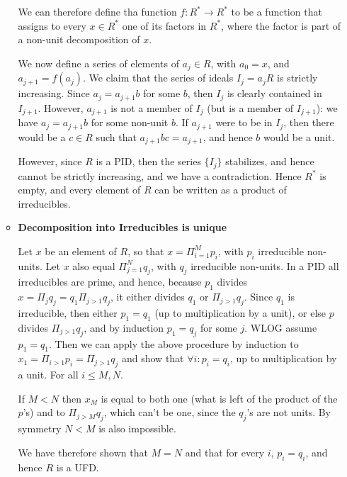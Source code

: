 \documentclass[11pt]{article} \usepackage{amssymb}
\begin{document}
\begin{enumerate}
\begin{itemize}
      We can therefore define tha function $f:R^*\to R^*$ to be a function
      that assigns to every $x\in R^*$ one of its factors in $R^*$, 
      where the factor is part of a non-unit decomposition of $x$.

      We now define a series of elements of $a_j\in R$, with $a_0=x$, 
      and $a_{j+1}=f(a_j)$. We claim that the series of ideals $I_j=a_jR$ is strictly
      increasing. Since $a_j=a_{j+1}b$ for some $b$, then $I_j$ is clearly
      contained in $I_{j+1}$. However, $a_{j+1}$ is not a member of $I_j$ (but
      is a member of $I_{j+1}$): we have $a_j=a_{j+1}b$ for some non-unit $b$. If 
      $a_{j+1}$ were to be in $I_j$, then 
      there would be a $c\in R$ such that $a_{j+1}bc=a_{j+1}$, and hence $b$ would be
      a unit.

      However, since $R$ is a PID, then the series $\{I_j\}$ stabilizes, and 
      hence cannot be strictly increasing, and we have a contradiction. Hence
      $R^*$ is empty, and every element of $R$ can be written as a product
      of irreducibles.
      
    \item {\bf Decomposition into Irreducibles is unique}

      Let $x$ be an element of $R$, so that 
      $x=\Pi_{i=1}^Mp_i$, with $p_i$ irreducible non-units.
      Let $x$ also equal $\Pi_{j=1}^Nq_j$, with $q_j$ irreducible non-units.
      In a PID all irreducibles are
      prime, and hence, because $p_1$ divides $x=\Pi_jq_j=q_1\Pi_{j>1}q_j$,
      it either divides $q_1$ or $\Pi_{j>1}q_j$. 
      Since $q_1$ is irreducible, then either $p_1=q_1$ (up to multiplication by
      a unit), or else $p$ divides
      $\Pi_{j>1}q_j$, and by induction $p_1=q_j$ for some $j$. WLOG assume $p_1=q_1$. Then
      we can apply the above procedure by induction to 
      $x_1=\Pi_{i>1}p_i=\Pi_{j>1}q_j$ and show that
      $\forall i:p_i=q_i$, up to multiplication by a unit. For all $i\leq M,N$.  
      
      If $M<N$ then $x_M$ is equal to both one (what is left of the product
      of the $p$'s) and to $\Pi_{j>M}q_j$, which can't be one, since the $q_j$'s 
      are not units. By symmetry $N<M$ is also impossible.
      
      We have therefore shown that $M=N$ and that for every $i$, $p_i=q_i$, and
      hence $R$ is a UFD.
    \end{itemize}


\end{enumerate}
\end{document}
